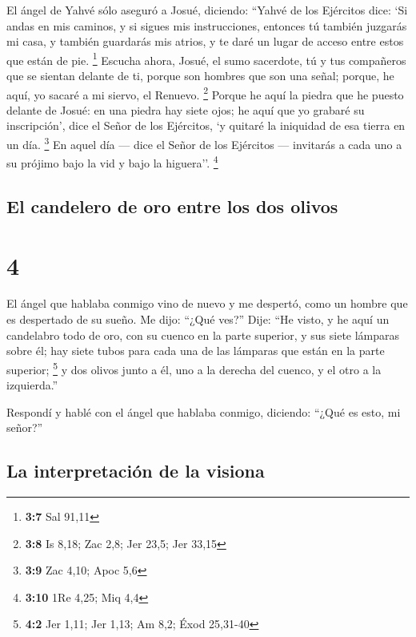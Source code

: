  El ángel de Yahvé sólo aseguró a Josué, diciendo:
 ``Yahvé de los Ejércitos dice: `Si andas en mis caminos,
y si sigues mis instrucciones, entonces tú también juzgarás mi casa, y
también guardarás mis atrios, y te daré un lugar de acceso entre estos
que están de pie. \footnote{\textbf{3:7} Sal 91,11} 
Escucha ahora, Josué, el sumo sacerdote, tú y tus compañeros que se
sientan delante de ti, porque son hombres que son una señal; porque, he
aquí, yo sacaré a mi siervo, el Renuevo. \footnote{\textbf{3:8} Is 8,18;
  Zac 2,8; Jer 23,5; Jer 33,15}  Porque he aquí la piedra
que he puesto delante de Josué: en una piedra hay siete ojos; he aquí
que yo grabaré su inscripción', dice el Señor de los Ejércitos, `y
quitaré la iniquidad de esa tierra en un día. \footnote{\textbf{3:9} Zac
  4,10; Apoc 5,6}  En aquel día --- dice el Señor de los
Ejércitos --- invitarás a cada uno a su prójimo bajo la vid y bajo la
higuera''. \footnote{\textbf{3:10} 1Re 4,25; Miq 4,4}

\hypertarget{el-candelero-de-oro-entre-los-dos-olivos}{%
\subsection{El candelero de oro entre los dos
olivos}\label{el-candelero-de-oro-entre-los-dos-olivos}}

\hypertarget{section-3}{%
\section{4}\label{section-3}}

 El ángel que hablaba conmigo vino de nuevo y me despertó,
como un hombre que es despertado de su sueño.  Me dijo:
``¿Qué ves?'' Dije: ``He visto, y he aquí un candelabro todo de oro, con
su cuenco en la parte superior, y sus siete lámparas sobre él; hay siete
tubos para cada una de las lámparas que están en la parte superior;
\footnote{\textbf{4:2} Jer 1,11; Jer 1,13; Am 8,2; Éxod 25,31-40}
 y dos olivos junto a él, uno a la derecha del cuenco, y
el otro a la izquierda.''

 Respondí y hablé con el ángel que hablaba conmigo,
diciendo: ``¿Qué es esto, mi señor?''

\hypertarget{la-interpretaciuxf3n-de-la-visiona}{%
\subsection{La interpretación de la
visiona}\label{la-interpretaciuxf3n-de-la-visiona}}

